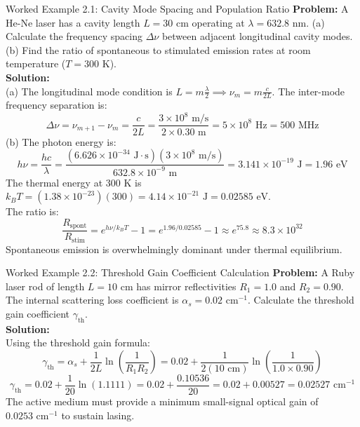 \begin{examplebox}{Worked Example 2.1: Cavity Mode Spacing and Population Ratio}
\textbf{Problem:} A He-Ne laser has a cavity length $L = 30\text{ cm}$ operating at $\lambda = 632.8\text{ nm}$. (a) Calculate the frequency spacing $\Delta\nu$ between adjacent longitudinal cavity modes. (b) Find the ratio of spontaneous to stimulated emission rates at room temperature ($T = 300\text{ K}$).\\
\textbf{Solution:}\\
(a) The longitudinal mode condition is $L = m \frac{\lambda}{2} \implies \nu_m = m \frac{c}{2L}$. The inter-mode frequency separation is:
\[
\Delta\nu = \nu_{m+1} - \nu_m = \frac{c}{2L} = \frac{3 \times 10^8\text{ m/s}}{2 \times 0.30\text{ m}} = 5 \times 10^8\text{ Hz} = 500\text{ MHz}
\]
(b) The photon energy is:
\[
h\nu = \frac{hc}{\lambda} = \frac{(6.626 \times 10^{-34}\text{ J}\cdot\text{s})(3 \times 10^8\text{ m/s})}{632.8 \times 10^{-9}\text{ m}} = 3.141 \times 10^{-19}\text{ J} = 1.96\text{ eV}
\]
The thermal energy at $300\text{ K}$ is $k_B T = (1.38 \times 10^{-23})(300) = 4.14 \times 10^{-21}\text{ J} = 0.02585\text{ eV}$.\\
The ratio is:
\[
\frac{R_{\text{spont}}}{R_{\text{stim}}} = e^{h\nu / k_B T} - 1 = e^{1.96 / 0.02585} - 1 \approx e^{75.8} \approx 8.3 \times 10^{32}
\]
Spontaneous emission is overwhelmingly dominant under thermal equilibrium.
\end{examplebox}

\begin{examplebox}{Worked Example 2.2: Threshold Gain Coefficient Calculation}
\textbf{Problem:} A Ruby laser rod of length $L = 10\text{ cm}$ has mirror reflectivities $R_1 = 1.0$ and $R_2 = 0.90$. The internal scattering loss coefficient is $\alpha_s = 0.02\text{ cm}^{-1}$. Calculate the threshold gain coefficient $\gamma_{\text{th}}$.\\
\textbf{Solution:}\\
Using the threshold gain formula:
\[
\gamma_{\text{th}} = \alpha_s + \frac{1}{2L}\ln\left(\frac{1}{R_1 R_2}\right) = 0.02 + \frac{1}{2(10\text{ cm})}\ln\left(\frac{1}{1.0 \times 0.90}\right)
\]
\[
\gamma_{\text{th}} = 0.02 + \frac{1}{20}\ln(1.1111) = 0.02 + \frac{0.10536}{20} = 0.02 + 0.00527 = 0.02527\text{ cm}^{-1}
\]
The active medium must provide a minimum small-signal optical gain of $0.0253\text{ cm}^{-1}$ to sustain lasing.
\end{examplebox}

